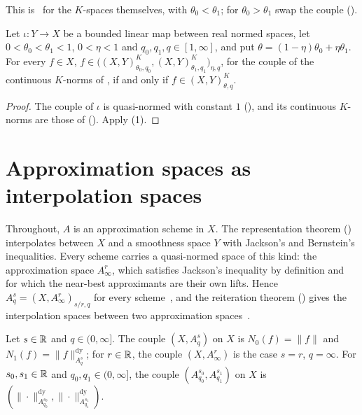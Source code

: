 This is~\cite[Theorems~3.5.3 and~3.11.5]{BerghLofstrom} for the $K$-spaces themselves, with
$\theta_0 < \theta_1$; for $\theta_0 > \theta_1$ swap the couple
().

\begin{corollary}
\label{cor:reiteration-map-couples}
\leanok
{}
Let $\iota : Y \to X$ be a bounded linear map between real normed spaces, let
$0 < \theta_0 < \theta_1 < 1$, $0 < \eta < 1$ and $q_0, q_1, q \in [1, \infty]$, and put
$\theta = (1 - \eta)\theta_0 + \eta\theta_1$. For every $f \in X$,
$f \in \bigl((X, Y)^K_{\theta_0, q_0}, (X, Y)^K_{\theta_1, q_1}\bigr)_{\eta, q}$, for the couple
of the continuous $K$-norms of , if and only if
$f \in (X, Y)^K_{\theta, q}$.
\end{corollary}

\begin{proof}
\leanok
The couple of $\iota$ is quasi-normed with constant $1$ (), and its
continuous $K$-norms are those of 
(). Apply  (1).
\end{proof}

\section{Approximation spaces as interpolation spaces}
\label{sec:approximation-spaces-interpolate}

Throughout, $A$ is an approximation scheme in $X$. The representation theorem
() interpolates between $X$ and a smoothness space $Y$ with Jackson's
and Bernstein's inequalities. Every scheme carries a quasi-normed space of this kind: the
approximation space $A^r_\infty$, which satisfies Jackson's inequality by definition and for
which the near-best approximants are their own lifts. Hence
$A^s_q = (X, A^r_\infty)_{s/r, q}$ for every scheme~\cite{Pietsch, DeVorePopovLNM}, and
the reiteration theorem () gives the interpolation spaces between two
approximation spaces~\cite[Chapter~7]{DeVoreLorentz}.

\begin{definition}
\label{def:approximation-space-couples}
\leanok
{}
Let $s \in \mathbb{R}$ and $q \in (0, \infty]$. The couple $(X, A^s_q)$ on $X$ is $N_0(f) = \|f\|$ and
$N_1(f) = \|f\|^{\mathrm{dy}}_{A^s_q}$; for $r \in \mathbb{R}$, the couple $(X, A^r_\infty)$ is the case
$s = r$, $q = \infty$. For $s_0, s_1 \in \mathbb{R}$ and
$q_0, q_1 \in (0, \infty]$, the couple $(A^{s_0}_{q_0}, A^{s_1}_{q_1})$ on $X$ is
$(\|\cdot\|^{\mathrm{dy}}_{A^{s_0}_{q_0}}, \|\cdot\|^{\mathrm{dy}}_{A^{s_1}_{q_1}})$.
\end{definition}

